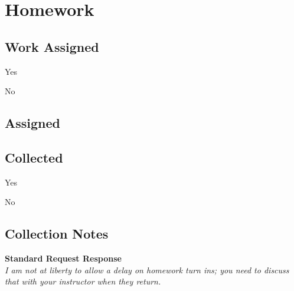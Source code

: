 \documentclass[10pt]{article}
\newcommand{\rulers}{\uline{\hfill\null }}
\begin{document}
\section*{Homework}
\begin{framed}

\section*{Work Assigned}
\begin{todolist}
    \item Yes
    \item No
\end{todolist}

\subsection*{Assigned}
\begin{description}
    \item \rulers
    \item \rulers 
\end{description}
\vspace{.2in}

\subsection*{Collected}
\begin{todolist}
    \item Yes
    \item No
\end{todolist}


\subsection*{Collection Notes}
\begin{description}
    \item \rulers
    \item \rulers
    \item[\small{Location of Collected Work}] \rulers
\end{description}
\vspace{0.2in}
\small{\textbf{Standard Request Response}} \\
\textit{\footnotesize{I am not at liberty to allow a delay on homework turn ins; you need to discuss that with your instructor when they return.}}

\vspace{0.2in}

\end{framed}
\end{document}
